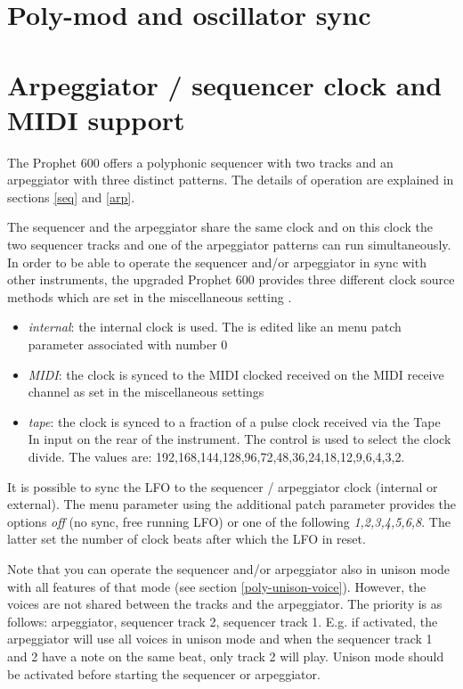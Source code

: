 \documentclass[landscape, 11pt, oneside]{report}
\newenvironment{flowtext}{\addmargin[0cm]{7cm}}{\endaddmargin} %
\begin{document}
\begin{flowtext}


\section{Poly-mod and oscillator sync}\label{polymod}



\section{Arpeggiator / sequencer clock and MIDI support}\label{sync}

The Prophet 600 offers a polyphonic sequencer with two tracks and an arpeggiator with three distinct patterns. The details of operation are explained in sections \ref{seq} and \ref{arp}.

The sequencer and the arpeggiator share the same clock and on this clock the two sequencer tracks and one of the arpeggiator patterns can run simultaneously. In order to be able to operate the sequencer and/or arpeggiator in sync with other instruments, the upgraded Prophet 600 provides three different clock source methods which are set in the miscellaneous setting \clocksync.
\begin{itemize}
  \item \textit{internal}: the internal clock is used. The \clock is edited like an menu patch parameter associated with number 0
  \item \textit{MIDI}: the clock is synced to the MIDI clocked received on the MIDI receive channel as set in the  miscellaneous settings
  \item \textit{tape}: the clock is synced to a fraction of a pulse clock received via the Tape In input on the rear of the instrument. The \clock control is used to select the clock divide. The values are: 192,168,144,128,96,72,48,36,24,18,12,9,6,4,3,2.
\end{itemize}  

It is possible to sync the LFO to the sequencer / arpeggiator clock (internal or external). The menu parameter  using the additional patch parameter \lfosync provides the options \textit{off} (no sync, free running LFO) or one of the following \textit{1,2,3,4,5,6,8}. The latter set the number of clock beats after which the LFO in reset.

Note that you can operate the sequencer and/or arpeggiator also in unison mode with all features of that mode (see section \ref{poly-unison-voice}). However, the voices are not shared between the tracks and the arpeggiator. The priority is as follows: arpeggiator, sequencer track 2, sequencer track 1. E.g. if activated, the arpeggiator will use all voices in unison mode and when the sequencer track 1 and 2 have a note on the same beat, only track 2 will play. Unison mode should be activated before starting the sequencer or arpeggiator.


\end{flowtext}
\end{document}
